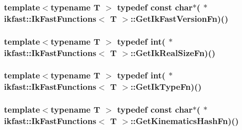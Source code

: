 \hypertarget{classikfast_1_1IkFastFunctions_aa76607a495cad0b6fff6b17b614fbcbb}{
\subsubsection[{Get\-Ik\-Fast\-Version\-Fn}]{\setlength{\rightskip}{0pt plus 5cm}template$<$typename T $>$ typedef const char$\ast$( $\ast$ {\bf ikfast\-::\-Ik\-Fast\-Functions}$<$ T $>$\-::Get\-Ik\-Fast\-Version\-Fn)()}}\label{classikfast_1_1IkFastFunctions_aa76607a495cad0b6fff6b17b614fbcbb}
\hypertarget{classikfast_1_1IkFastFunctions_a8fdfa2de1f393a175d2c7629d1388b24}{
\subsubsection[{Get\-Ik\-Real\-Size\-Fn}]{\setlength{\rightskip}{0pt plus 5cm}template$<$typename T $>$ typedef int( $\ast$ {\bf ikfast\-::\-Ik\-Fast\-Functions}$<$ T $>$\-::Get\-Ik\-Real\-Size\-Fn)()}}\label{classikfast_1_1IkFastFunctions_a8fdfa2de1f393a175d2c7629d1388b24}
\hypertarget{classikfast_1_1IkFastFunctions_afcd749bb7f6e0f5dce01cac098d6cc81}{
\subsubsection[{Get\-Ik\-Type\-Fn}]{\setlength{\rightskip}{0pt plus 5cm}template$<$typename T $>$ typedef int( $\ast$ {\bf ikfast\-::\-Ik\-Fast\-Functions}$<$ T $>$\-::Get\-Ik\-Type\-Fn)()}}\label{classikfast_1_1IkFastFunctions_afcd749bb7f6e0f5dce01cac098d6cc81}
\hypertarget{classikfast_1_1IkFastFunctions_ae7fca1cf436c1b8e43a35f275f1c48ff}{
\subsubsection[{Get\-Kinematics\-Hash\-Fn}]{\setlength{\rightskip}{0pt plus 5cm}template$<$typename T $>$ typedef const char$\ast$( $\ast$ {\bf ikfast\-::\-Ik\-Fast\-Functions}$<$ T $>$\-::Get\-Kinematics\-Hash\-Fn)()}}\label{classikfast_1_1IkFastFunctions_ae7fca1cf436c1b8e43a35f275f1c48ff}
